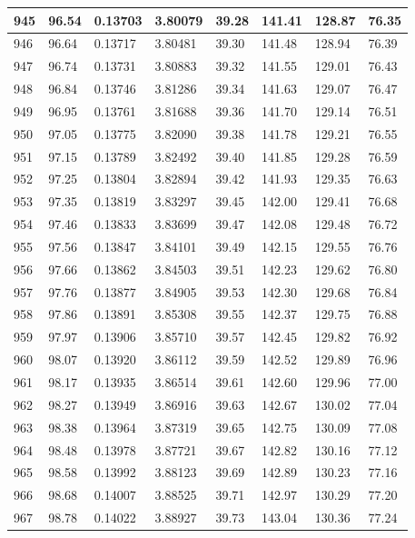 \documentclass[12pt,a4paper,twoside]{article}
\begin{document}
\begin{center}
\begin{longtable}{l l l l | l l l l}
945 & 96.54 & 0.13703 & 3.80079 & 39.28 & 141.41 & 128.87 & 76.35 \\ \hline
946 & 96.64 & 0.13717 & 3.80481 & 39.30 & 141.48 & 128.94 & 76.39 \\ \hline
947 & 96.74 & 0.13731 & 3.80883 & 39.32 & 141.55 & 129.01 & 76.43 \\ \hline
948 & 96.84 & 0.13746 & 3.81286 & 39.34 & 141.63 & 129.07 & 76.47 \\ \hline
949 & 96.95 & 0.13761 & 3.81688 & 39.36 & 141.70 & 129.14 & 76.51 \\ \hline
950 & 97.05 & 0.13775 & 3.82090 & 39.38 & 141.78 & 129.21 & 76.55 \\ \hline
951 & 97.15 & 0.13789 & 3.82492 & 39.40 & 141.85 & 129.28 & 76.59 \\ \hline
952 & 97.25 & 0.13804 & 3.82894 & 39.42 & 141.93 & 129.35 & 76.63 \\ \hline
953 & 97.35 & 0.13819 & 3.83297 & 39.45 & 142.00 & 129.41 & 76.68 \\ \hline
954 & 97.46 & 0.13833 & 3.83699 & 39.47 & 142.08 & 129.48 & 76.72 \\ \hline
955 & 97.56 & 0.13847 & 3.84101 & 39.49 & 142.15 & 129.55 & 76.76 \\ \hline
956 & 97.66 & 0.13862 & 3.84503 & 39.51 & 142.23 & 129.62 & 76.80 \\ \hline
957 & 97.76 & 0.13877 & 3.84905 & 39.53 & 142.30 & 129.68 & 76.84 \\ \hline
958 & 97.86 & 0.13891 & 3.85308 & 39.55 & 142.37 & 129.75 & 76.88 \\ \hline
959 & 97.97 & 0.13906 & 3.85710 & 39.57 & 142.45 & 129.82 & 76.92 \\ \hline
960 & 98.07 & 0.13920 & 3.86112 & 39.59 & 142.52 & 129.89 & 76.96 \\ \hline
961 & 98.17 & 0.13935 & 3.86514 & 39.61 & 142.60 & 129.96 & 77.00 \\ \hline
962 & 98.27 & 0.13949 & 3.86916 & 39.63 & 142.67 & 130.02 & 77.04 \\ \hline
963 & 98.38 & 0.13964 & 3.87319 & 39.65 & 142.75 & 130.09 & 77.08 \\ \hline
964 & 98.48 & 0.13978 & 3.87721 & 39.67 & 142.82 & 130.16 & 77.12 \\ \hline
965 & 98.58 & 0.13992 & 3.88123 & 39.69 & 142.89 & 130.23 & 77.16 \\ \hline
966 & 98.68 & 0.14007 & 3.88525 & 39.71 & 142.97 & 130.29 & 77.20 \\ \hline
967 & 98.78 & 0.14022 & 3.88927 & 39.73 & 143.04 & 130.36 & 77.24 \\ \hline

\end{longtable}
\end{center}
\end{document}
